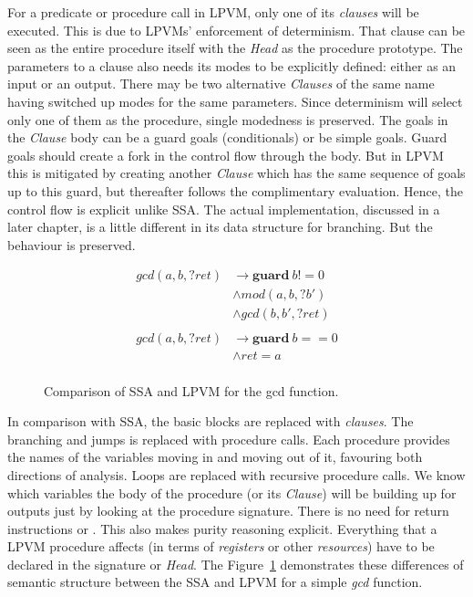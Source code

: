 For a predicate or procedure call in LPVM, only one of its \textit{clauses} will be
executed. This is due to LPVMs' enforcement of determinism. That clause can be
seen as the entire procedure itself with the \textit{Head} as the procedure
prototype. The parameters to a clause also needs its modes to be explicitly
defined: either as an input or an output. There may be two alternative
\textit{Clauses} of the same name having switched up modes for the same
parameters. Since determinism will select only one of them as the procedure,
single modedness is preserved. The goals in the \textit{Clause} body can be a
guard goals (conditionals) or be simple goals. Guard goals should create a fork
in the control flow through the body. But in LPVM this is mitigated by creating
another \textit{Clause} which has the same sequence of goals up to this guard,
but thereafter follows the complimentary evaluation. Hence, the control flow is
explicit unlike SSA. The actual implementation, discussed in a later chapter,
is a little different in its data structure for branching. But the behaviour is
preserved. 


\begin{figure}
  \begin{minipage}{.5\textwidth}
  \end{minipage}
  \begin{minipage}{.5\textwidth}
    \begin{align*}
      gcd(a,b,?ret) &\rightarrow \mathbf{guard}\ b != 0 \\
                    &\wedge mod(a,b,?b') \\
                    &\wedge gcd(b,b',?ret) \\
      \\
      gcd(a,b,?ret) &\rightarrow \mathbf{guard}\ b == 0 \\
      &\wedge ret=a \\
    \end{align*}
  \end{minipage}
  \caption{Comparison of SSA and LPVM for the gcd function.}
  \label{fig:gcd_ssa_lpvm}
\end{figure}



In comparison with SSA, the basic blocks are replaced with \textit{clauses}.
The branching and jumps is replaced with procedure calls. Each procedure
provides the names of the variables moving in and moving out of it, favouring
both directions of analysis. Loops are replaced with recursive procedure
calls. We know which variables the body of the procedure (or its
\textit{Clause}) will be building up for outputs just by looking at the
procedure signature. There is no need for return instructions or \phifs. This
also makes purity reasoning explicit. Everything that a LPVM procedure affects
(in terms of \textit{registers} or other \textit{resources}) have to be
declared in the signature or \textit{Head}. The Figure~\ref{fig:gcd_ssa_lpvm}
demonstrates these differences of semantic structure between the SSA and LPVM
for a simple \textit{gcd} function.

